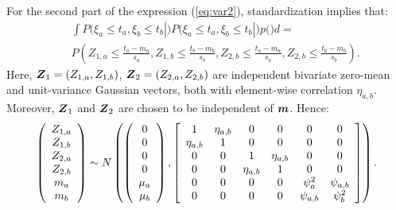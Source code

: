 \documentclass[aoas]{imsart}
\begin{document}
For the second part of the expression (\ref{eq:var2}), standardization
implies that: 
\begin{eqnarray}\label{part1:phi4}
&& \int P(\xi_a \leq t_a, \xi_b \leq t_b|\bm) P(\xi_a \leq t_a, \xi_b \leq t_b|\bm) p(\bm) d\bm =  \\
&& P\left( Z_{1,a} \leq \frac{t_a-m_{a}}{s_{a}}, 
Z_{1,b} \leq \frac{t_b-m_{b}}{s_{b}},Z_{2,b} \leq \frac{t_a-m_{a}}{s_{a}}, 
Z_{2,b} \leq \frac{t_b-m_{b}}{s_{b}} \right). \nonumber
\end{eqnarray}
Here, ${\boldsymbol Z}_1=(Z_{1,a},Z_{1,b})$, ${\boldsymbol Z}_2=(Z_{2,a},Z_{2,b})$ are
independent bivariate zero-mean and unit-variance Gaussian vectors,
both with element-wise correlation $\eta_{a,b}$. Moreover, ${\boldsymbol Z}_1$ and
${\boldsymbol Z}_2$ are chosen to be independent of ${\boldsymbol m}$. Hence:
\begin{equation}
    \left(
    \begin{array}{cccccc}
         Z_{1,a} \\
         Z_{1,b} \\
         Z_{2,a} \\
         Z_{2,b} \\
         m_{a} \\
         m_{b}
    \end{array}
    \right)
\sim N \left(
\left(
    \begin{array}{cccccc}
    0 \\
    0 \\
    0 \\
    0 \\
          \mu_{a} \\
         \mu_{b} 
    \end{array}
    \right),
   \left[ 
      \begin{array}{cccccc}
        1 & \eta_{a,b} & 0 & 0 & 0 & 0  \\
        \eta_{a,b} & 1 & 0 & 0 & 0 & 0 \\
        0 & 0 & 1 & \eta_{a,b} & 0 & 0 \\
        0 & 0 & \eta_{a,b} & 1 & 0 & 0 \\
        0 & 0 & 0 & 0 & \psi^2_{a} & \psi_{a,b} \\
        0 & 0 & 0 & 0 & \psi_{a,b} & \psi^2_{b} 
    \end{array}
\right]
\right).
\vspace{0.2cm}
\end{equation}
\end{document}
